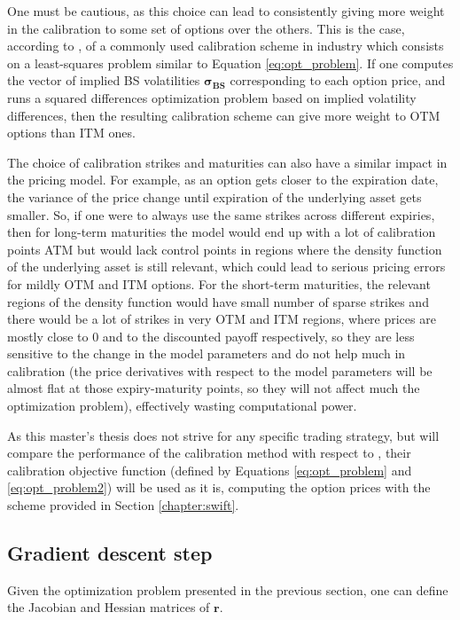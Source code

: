 \documentclass[12,twoside]{mammeTFM}
\theoremstyle{definition}
\theoremstyle{remark}
\begin{document}
One must be cautious, as this choice can lead to consistently giving more weight in the calibration to some set of options over the others. This is the case, according to \cite{cui17}, of a commonly used calibration scheme in industry which consists on a least-squares problem similar to Equation \ref{eq:opt_problem}. If one computes the vector of implied BS volatilities $\boldsymbol{\sigma_{BS}}$ corresponding to each option price, and runs a squared differences optimization problem based on implied volatility differences, then the resulting calibration scheme can give more weight to OTM options than ITM ones.

The choice of calibration strikes and maturities can also have a similar impact in the pricing model. For example, as an option gets closer to the expiration date, the variance of the price change until expiration of the underlying asset gets smaller. So, if one were to always use the same strikes across different expiries, then for long-term maturities the model would end up with a lot of calibration points ATM but would lack control points in regions where the density function of the underlying asset is still relevant, which could lead to serious pricing errors for mildly OTM and ITM options. For the short-term maturities, the relevant regions of the density function would have small number of sparse strikes and there would be a lot of strikes in very OTM and ITM regions, where prices are mostly close to 0 and to the discounted payoff respectively, so they are less sensitive to the change in the model parameters and do not help much in calibration (the price derivatives with respect to the model parameters will be almost flat at those expiry-maturity points, so they will not affect much the optimization problem), effectively wasting computational power.

As this master's thesis does not strive for any specific trading strategy, but will compare the performance of the calibration method with respect to \cite{cui17}, their calibration objective function (defined by Equations \ref{eq:opt_problem} and \ref{eq:opt_problem2}) will be used as it is, computing the option prices with the scheme provided in Section \ref{chapter:swift}.

\subsection{Gradient descent step} \label{sec:gradient}
Given the optimization problem presented in the previous section, one can define the Jacobian and Hessian matrices of $\boldsymbol{r}$.
\end{document}
